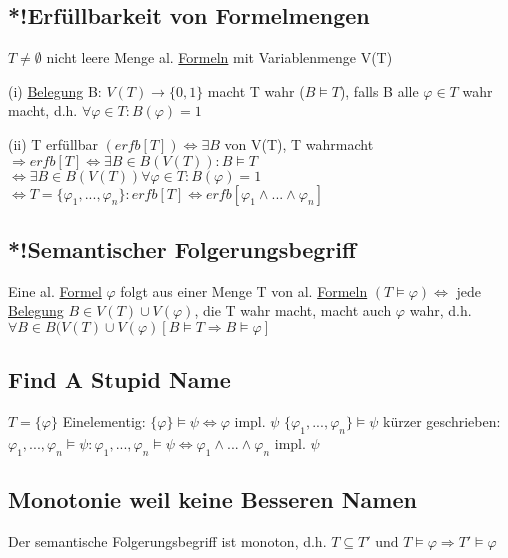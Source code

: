 \documentclass[12pt,a4paper]{article} %
\begin{document}
	\subsection{*!Erfüllbarkeit von Formelmengen}
	\label{Erfullbar}
	$T \ne \emptyset$ nicht leere Menge al. \hyperref[Formel]{Formeln} mit Variablenmenge V(T)
	
	(i) \hyperref[Belegung]{Belegung} B: $V(T) \rightarrow\{0, 1\}$ macht T wahr ($B \vDash T$), falls B alle $\varphi \in T$ wahr macht, d.h. $\forall \varphi \in T: B(\varphi) = 1$
	
	(ii) T erfüllbar $(erfb[T]) \Leftrightarrow \exists B$ von V(T), T wahrmacht \newline
	$\Rightarrow erfb[T] \Leftrightarrow \exists B \in B(V(T)): B \vDash T$ \newline
	$\Leftrightarrow \exists B \in B(V(T)) \forall \varphi \in T: B(\varphi) = 1$ \newline
	$\Leftrightarrow T = \{\varphi_1, ..., \varphi_n\}: erfb[T] \Leftrightarrow erfb[\varphi_1 \land ... \land \varphi_n]$
	
	\subsection{*!Semantischer Folgerungsbegriff}
	Eine al. \hyperref[Formel]{Formel} $\varphi$ folgt aus einer Menge T von al. \hyperref[Formel]{Formeln} $(T \hyperref[Erfullbar]{\vDash} \varphi) \Leftrightarrow$ jede \hyperref[Belegung]{Belegung} $B \in V(T) \cup V(\varphi)$, die T wahr macht, macht auch $\varphi$ wahr, d.h. $\forall B \in B(V(T) \cup V(\varphi) [B \hyperref[Erfullbar]{\vDash} T \Rightarrow B \hyperref[Erfullbar]{\vDash} \varphi]$ 
	
	\subsection{Find A Stupid Name}
	$T = \{\varphi\}$ Einelementig: $\{\varphi\} \hyperref[Erfullbar]{\vDash} \psi \Leftrightarrow \varphi$ impl. $\psi$ \newline
	$\{\varphi_1, ..., \varphi_n\} \hyperref[Erfullbar]{\vDash} \psi$ kürzer geschrieben: \newline $\varphi_1, ..., \varphi_n \hyperref[Erfullbar]{\vDash} \psi: \varphi_1, ..., \varphi_n \hyperref[Erfullbar]{\vDash} \psi \Leftrightarrow \varphi_1 \land ... \land \varphi_n$ impl. $\psi$
	
	\subsection[Monotonie]{Monotonie weil keine Besseren Namen}
	Der semantische Folgerungsbegriff ist monoton, d.h. \newline
	$T \subseteq T'\text{ und } T \hyperref[Erfullbar]{\vDash} \varphi \Rightarrow T' \hyperref[Erfullbar]{\vDash} \varphi$
	
\end{document}
